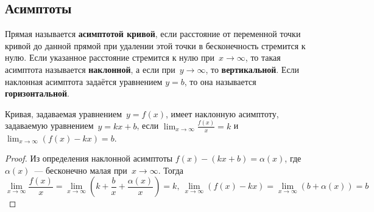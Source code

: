\subsection{Асимптоты}
 Прямая называется \textbf{асимптотой кривой}, если расстояние от переменной точки кривой до данной прямой при удалении этой точки в бесконечность стремится к нулю.
Если указанное расстояние стремится к нулю при~$x \to \infty$, то такая асимптота называется \textbf{наклонной}, а если при~$y \to \infty$, то \textbf{вертикальной}.
Если наклонная асимптота задаётся уравнением $y = b$, то она называется \textbf{горизонтальной}.

\begin{theorem}
Кривая, задаваемая уравнением~$y = f(x)$, имеет наклонную асимптоту, задаваемую уравнением~$y = kx + b$, если $\displaystyle \lim_{x \to \infty} \frac{f(x)}x = k$ и $\displaystyle \lim_{x \to \infty} (f(x) - kx) = b$.
\end{theorem}
\begin{proof}
Из определения наклонной асимптоты $f(x) - (kx + b) = \alpha(x)$, где $\alpha(x)$~--- бесконечно малая при~$x \to \infty$.
Тогда
\begin{equation*}
\lim_{x \to \infty} \frac{f(x)}x =
\lim_{x \to \infty} \left( k + \frac{b}x + \frac{\alpha(x)}x \right) =
k, \
\lim_{x \to \infty} (f(x) - kx) =
\lim_{x \to \infty} (b + \alpha(x)) =
b
\end{equation*}
\end{proof}